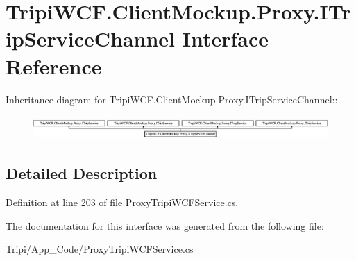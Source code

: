 \hypertarget{interface_tripi_w_c_f_1_1_client_mockup_1_1_proxy_1_1_i_trip_service_channel}{
\section{TripiWCF.ClientMockup.Proxy.ITripServiceChannel Interface Reference}
\label{interface_tripi_w_c_f_1_1_client_mockup_1_1_proxy_1_1_i_trip_service_channel}
}
Inheritance diagram for TripiWCF.ClientMockup.Proxy.ITripServiceChannel::\begin{figure}[H]
\begin{center}
\leavevmode
\includegraphics[height=0.900322cm]{interface_tripi_w_c_f_1_1_client_mockup_1_1_proxy_1_1_i_trip_service_channel}
\end{center}
\end{figure}


\subsection{Detailed Description}


Definition at line 203 of file ProxyTripiWCFService.cs.

The documentation for this interface was generated from the following file:\begin{DoxyCompactItemize}
\item 
Tripi/App\_\-Code/ProxyTripiWCFService.cs\end{DoxyCompactItemize}
